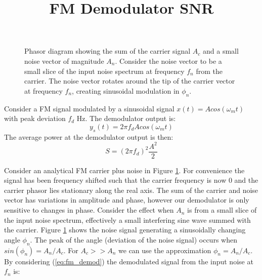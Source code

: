 \documentclass{article}
\begin{document}
\title{FM Demodulator SNR}
\maketitle

\begin{figure}[h]
\begin{center}
\end{center}
\label{fig:phasor}
\caption{Phasor diagram showing the sum of the carrier signal $A_c$ and a small noise vector of magnitude $A_n$.  Consider the noise vector to be a small slice of the input noise spectrum at frequency $f_n$ from the carrier. The noise vector rotates around the tip of the carrier vector at frequency $f_n$, creating sinusoidal modulation in $\phi_n$.}

\end{figure}

Consider a FM signal modulated by a sinusoidal signal $x(t)=Acos(\omega_mt)$ with peak deviation $f_d$ Hz.  The demodulator output is: 
\begin{equation}
y_s(t) = 2 \pi f_d A cos (\omega_m t)
\end{equation}
The average power at the demodulator output is then:
\begin{equation}
\label{eq:fm_demod}
S = (2 \pi f_d )^2 \frac{A^2}{2}
\end{equation}

Consider an analytical FM carrier plus noise in Figure \ref{fig:phasor}. For convenience the signal has been frequency shifted such that the carrier frequency is now 0 and the carrier phasor lies stationary along the real axis.  The sum of the carrier and noise vector has variations in amplitude and phase, however our demodulator is only sensitive to changes in phase. Consider the effect when $A_n$ is from a small slice of the input noise spectrum, effectively a small interfering sine wave summed with the carrier. Figure \ref{fig:phasor} shows the noise signal generating a sinusoidally changing angle $\phi_n$.  The peak of the angle (deviation of the noise signal) occurs when $sin(\phi_n) = A_n/A_c$. For $A_c>>A_n$ we can use the approximation $\phi_n=A_n/A_c$.  By considering (\ref{eq:fm_demod}) the demodulated signal from the input noise at $f_n$ is:
\end{document}
